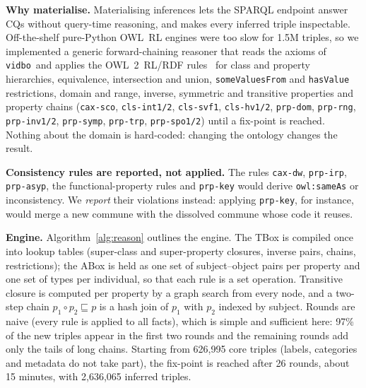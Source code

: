 \documentclass{article}
\newcommand{\ttl}[1]{\texttt{#1}}          %
\newcommand{\vidbo}{\ttl{vidbo}}
\begin{document}
\textbf{Why materialise.} Materialising inferences lets the SPARQL endpoint answer CQs without query-time reasoning,
and makes every inferred triple inspectable. Off-the-shelf pure-Python OWL~RL engines were too slow for 1.5M triples,
so we implemented a generic forward-chaining reasoner that reads the axioms of \vidbo\ and applies the OWL~2~RL/RDF
rules~\cite{owl2profiles} for class and property hierarchies, equivalence, intersection and union,
\texttt{someValuesFrom} and \texttt{hasValue} restrictions, domain and range, inverse, symmetric and transitive
properties and property chains (\texttt{cax-sco}, \texttt{cls-int1/2}, \texttt{cls-svf1}, \texttt{cls-hv1/2},
\texttt{prp-dom}, \texttt{prp-rng}, \texttt{prp-inv1/2}, \texttt{prp-symp}, \texttt{prp-trp}, \texttt{prp-spo1/2})
until a fix-point is reached. Nothing about the domain is hard-coded: changing the ontology changes the result.

\textbf{Consistency rules are reported, not applied.} The rules \texttt{cax-dw}, \texttt{prp-irp}, \texttt{prp-asyp},
the functional-property rules and \texttt{prp-key} would derive \texttt{owl:sameAs} or inconsistency. We \emph{report}
their violations instead: applying \texttt{prp-key}, for instance, would merge a new commune with the dissolved commune
whose code it reuses.

\textbf{Engine.} Algorithm~\ref{alg:reason} outlines the engine. The TBox is compiled once into lookup tables
(super-class and super-property closures, inverse pairs, chains, restrictions); the ABox is held as one set of
subject--object pairs per property and one set of types per individual, so that each rule is a set operation.
Transitive closure is computed per property by a graph search from every node, and a two-step chain
$p_1 \circ p_2 \sqsubseteq p$ is a hash join of $p_1$ with $p_2$ indexed by subject. Rounds are naive (every rule is applied to all facts), which is simple and sufficient here: 97\% of
the new triples appear in the first two rounds and the remaining rounds add only the tails of long chains. Starting
from 626{,}995 core triples (labels, categories and metadata do not take part), the fix-point is reached after
26 rounds, about 15 minutes, with 2{,}636{,}065 inferred triples.
\end{document}
